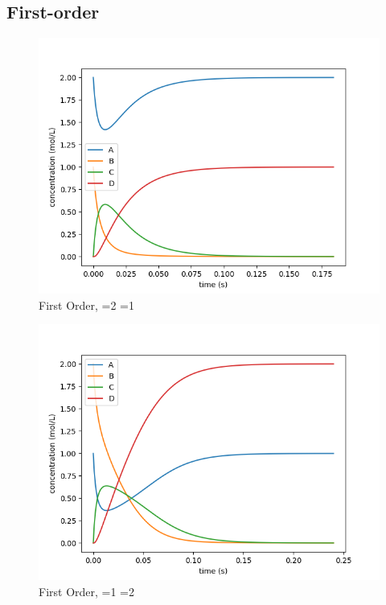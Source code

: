 \documentclass{article}
\begin{document}
\subsection{First-order}
\begin{figure}[H]
\centering
\includegraphics[scale=0.6]{2. first 2 1.png}
\caption{First Order, =2 =1}
\end{figure}
\begin{figure}[H]
\centering
\includegraphics[scale=0.6]{2. first 1 2.png}
\caption{First Order, =1 =2}
\end{figure}
\end{document}

